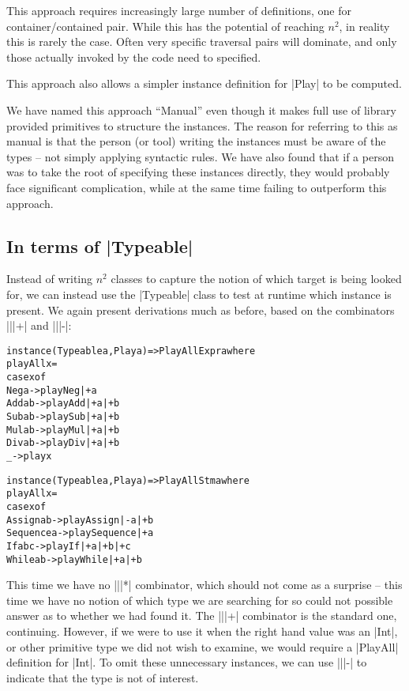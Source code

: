 \documentclass[preprint]{sigplanconf}
\newenvironment{code}{\begin{alltt}\small}{\end{alltt}}
\begin{document}
This approach requires increasingly large number of definitions, one for container/contained pair. While this has the potential of reaching $n^2$, in reality this is rarely the case. Often very specific traversal pairs will dominate, and only those actually invoked by the code need to specified.

This approach also allows a simpler instance definition for |Play| to be computed.

We have named this approach ``Manual'' even though it makes full use of library provided primitives to structure the instances. The reason for referring to this as manual is that the person (or tool) writing the instances must be aware of the types -- not simply applying syntactic rules. We have also found that if a person was to take the root of specifying these instances directly, they would probably face significant complication, while at the same time failing to outperform this approach.


\subsection{In terms of |Typeable|}

Instead of writing $n^2$ classes to capture the notion of which target is being looked for, we can instead use the |Typeable| class to test at runtime which instance is present. We again present derivations much as before, based on the combinators |||+| and |||-|:

\begin{code}
instance (Typeable a, Play a) => PlayAll Expr a where
    playAll x =
        case x of
            Neg a    ->  play Neg  |+ a
            Add a b  ->  play Add  |+ a |+ b
            Sub a b  ->  play Sub  |+ a |+ b
            Mul a b  ->  play Mul  |+ a |+ b
            Div a b  ->  play Div  |+ a |+ b
            _        ->  play x

instance (Typeable a, Play a) => PlayAll Stm a where
    playAll x =
        case x of
            Assign a b -> play Assign |- a |+ b
            Sequence a -> play Sequence |+ a
            If a b c -> play If |+ a |+ b |+ c
            While a b -> play While |+ a |+ b
\end{code}

This time we have no |||*| combinator, which should not come as a surprise -- this time we have no notion of which type we are searching for so could not possible answer as to whether we had found it. The |||+| combinator is the standard one, continuing. However, if we were to use it when the right hand value was an |Int|, or other primitive type we did not wish to examine, we would require a |PlayAll| definition for |Int|. To omit these unnecessary instances, we can use |||-| to indicate that the type is not of interest.
\end{document}
